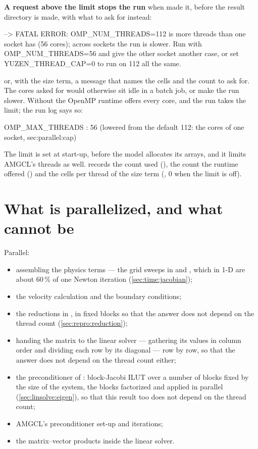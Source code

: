 \textbf{A request above the limit stops the run} when 
made it, before the result directory is made, with what to ask for instead:
\begin{shell}
--> FATAL ERROR: OMP_NUM_THREADS=112 is more threads than one socket has (56 cores); across sockets the run is slower. Run with OMP_NUM_THREADS=56 and give the other socket another case, or set YUZEN_THREAD_CAP=0 to run on 112 all the same.
\end{shell}
or, with the size term, a message that names the cells and the count to ask
for. The cores asked for would otherwise sit idle in a batch job, or make the
run slower. Without  the OpenMP runtime offers every
core, and the run takes the limit; the run log says so:
\begin{shell}
 OMP_MAX_THREADS : 56 (lowered from the default 112: the cores of one socket, sec:parallel:cap)
\end{shell}
The limit is set at start-up, before the model allocates its arrays, and it
limits AMGCL's threads as well.  records the count used
(), the count the runtime offered
() and the cells per thread of the size term
(, 0 when the limit is off).

\section{What is parallelized, and what cannot be}
\label{sec:parallel:what}

Parallel:

\begin{itemize}
  \item assembling the physics terms --- the grid sweeps in 
    and , which in 1-D are about 60\,\% of one Newton
    iteration (\cref{sec:time:jacobian});
  \item the velocity calculation and the boundary conditions;
  \item the reductions in , in fixed blocks so that the answer
    does not depend on the thread count (\cref{sec:repro:reduction});
  \item handing the matrix to the linear solver --- gathering its values in
    column order and dividing each row by its diagonal --- row by row, so that
    the answer does not depend on the thread count either;
  \item the preconditioner of : block-Jacobi ILUT over a number
    of blocks fixed by the size of the system, the blocks factorized and
    applied in parallel (\cref{sec:linsolve:eigen}), so that this result too
    does not depend on the thread count;
  \item AMGCL's preconditioner set-up and iterations;
  \item the matrix--vector products inside the linear solver.
\end{itemize}

